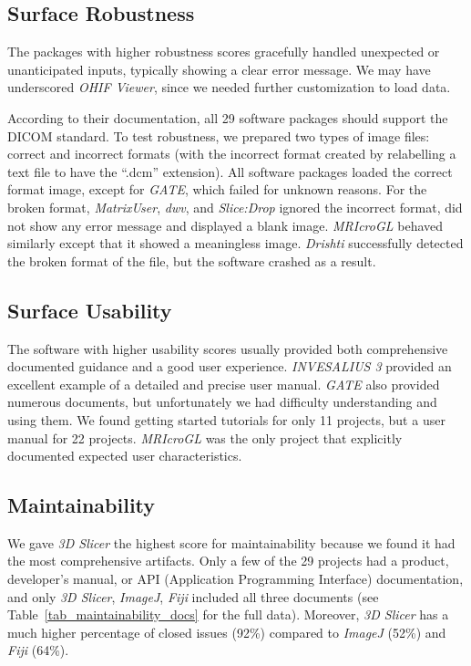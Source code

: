 \documentclass[final, 12pt, 3p, times]{elsarticle}
\begin{document}
\subsection{Surface Robustness} \label{sec_result_robustness}

The packages with higher robustness scores gracefully handled unexpected or unanticipated
inputs, typically showing a clear error message. We may have underscored
\textit{OHIF Viewer}, since we needed further customization to load
data.

According to their documentation, all 29 software packages should support the
DICOM standard. To test robustness, we prepared two types of image files:
correct and incorrect formats (with the incorrect format created by relabelling a
text file to have the ``.dcm'' extension).  All software packages loaded the
correct format image, except for \textit{GATE}, which failed for unknown
reasons.  For the broken format, \textit{MatrixUser}, \textit{dwv}, and
\textit{Slice:Drop} ignored the incorrect format,
did not show any error message and displayed a blank image.
\textit{MRIcroGL} behaved similarly except that it showed a meaningless image.
\textit{Drishti} successfully detected the broken format of the file, but the
software crashed as a result.

\subsection{Surface Usability} \label{sec_result_usability}

The software with higher usability scores usually provided both comprehensive
documented guidance and a good user experience. \textit{INVESALIUS 3} provided
an excellent example of a detailed and precise user manual. \textit{GATE} also
provided numerous documents, but unfortunately we had difficulty understanding
and using them. We found getting started tutorials for only 11 projects, but a
user manual for 22 projects. \textit{MRIcroGL} was the only project that
explicitly documented expected user characteristics.

\subsection{Maintainability} \label{sec_score_maintainability}

We gave \textit{3D Slicer} the highest score for maintainability because we
found it had the most comprehensive artifacts. Only a few of the 29 projects had
a product, developer's manual, or API (Application Programming Interface)
documentation, and only \textit{3D Slicer}, \textit{ImageJ}, \textit{Fiji}
included all three documents (see Table~\ref{tab_maintainability_docs} for the
full data).  Moreover, \textit{3D Slicer} has a much higher percentage of closed
issues (92\%) compared to \textit{ImageJ} (52\%) and \textit{Fiji} (64\%).
\end{document}
